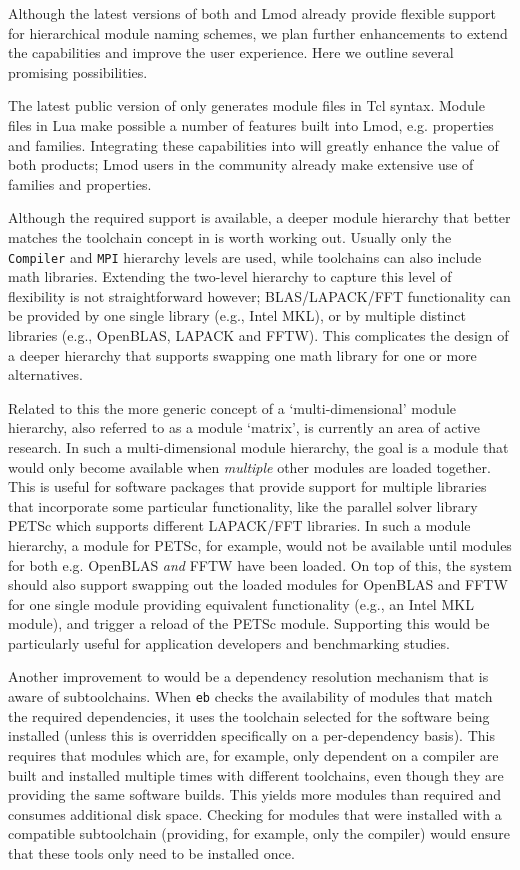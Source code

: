 Although the latest versions of both \easybuild{} and Lmod already provide
flexible support for hierarchical module naming schemes, we plan further enhancements to extend the capabilities and improve the user experience. Here we outline several promising possibilities.

The latest public version of \easybuild{} only generates
module files in Tcl syntax. Module files in Lua make possible a number of features built into Lmod, e.g. properties and
families. Integrating these capabilities into \easybuild{} will greatly enhance the value of both products; Lmod users
in the \easybuild{} community already make extensive use of families and properties.

Although the required support is available, a deeper module hierarchy that
better matches the toolchain concept in \easybuild{} is worth working out.
Usually only the \texttt{Compiler} and \texttt{MPI} hierarchy levels are used,
while \easybuild{} toolchains can also include math libraries. Extending
the two-level hierarchy to capture this level of flexibility is not straightforward however;
BLAS/LAPACK/FFT functionality can be provided by one single library (e.g.,
Intel MKL), or by multiple distinct libraries (e.g., OpenBLAS, LAPACK and FFTW).
This complicates the design of a deeper hierarchy that supports swapping one
math library for one or more alternatives.

Related to this the more generic concept of a `multi-dimensional' module hierarchy,
also referred to as a module `matrix', is currently an area of active research.
In such a multi-dimensional module hierarchy, the goal is a module that would
only become available when \emph{multiple} other modules are loaded together. This is useful for software packages that provide support for multiple libraries that incorporate some particular functionality, like the parallel
solver library PETSc which supports different LAPACK/FFT libraries. In such a module hierarchy, a module for PETSc, for example, would not be available until modules
for both e.g. OpenBLAS \emph{and} FFTW have been loaded. On top of this, the system should
also support swapping out the loaded modules for OpenBLAS and FFTW for one single
module providing equivalent functionality (e.g., an Intel MKL module), and trigger a
reload of the PETSc module. Supporting this would be particularly useful for
application developers and benchmarking studies.

Another improvement to \easybuild{} would be a dependency resolution
mechanism that is aware of subtoolchains. When \texttt{eb} checks the availability of
modules that match the required dependencies, it uses the toolchain selected
for the software being installed (unless this is overridden specifically on a
per-dependency basis). This requires that modules which are, for example, only
dependent on a compiler are built and installed multiple times with different
toolchains, even though they are providing the same software builds. This yields
more modules than required and consumes additional disk space. Checking for
modules that were installed with a compatible subtoolchain  (providing, for example,
only the compiler) would ensure that these tools only need to be installed once.

